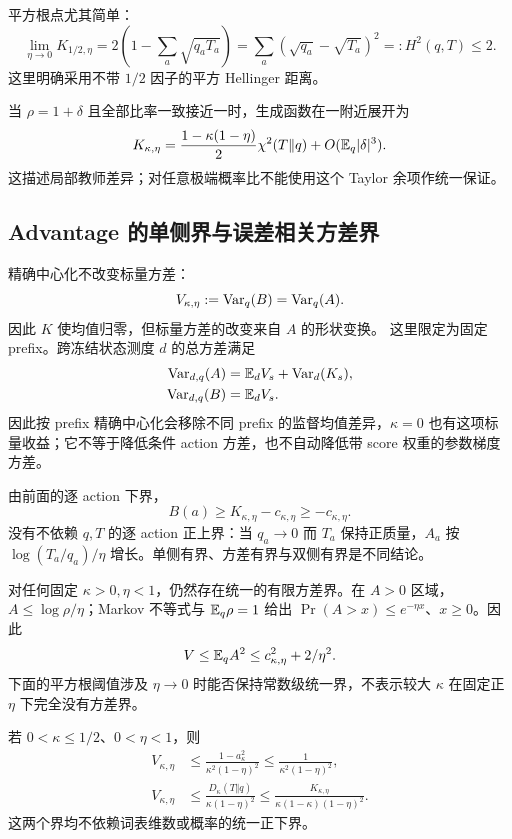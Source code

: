 平方根点尤其简单：
\begin{equation}
 \lim_{\eta\to0}K_{1/2,\eta}
 =2\left(1-\sum_a\sqrt{q_aT_a}\right)
 =\sum_a(\sqrt{q_a}-\sqrt{T_a})^2=:H^2(q,T)\le2.
\end{equation}
这里明确采用不带 $1/2$ 因子的平方 Hellinger 距离。

当 $\rho=1+\delta$ 且全部比率一致接近一时，生成函数在一附近展开为
\begin{equation}
 K_{\kappa,\eta}
 =\frac{1-\kappa(1-\eta)}2\chi^2(T\Vert q)
  +O(\mathbb E_q|\delta|^3).
\end{equation}
这描述局部教师差异；对任意极端概率比不能使用这个 Taylor 余项作统一保证。
\subsection{Advantage 的单侧界与误差相关方差界}

精确中心化不改变标量方差：
\begin{equation}
 V_{\kappa,\eta}:=\operatorname{Var}_q(B)=\operatorname{Var}_q(A).
\end{equation}
因此 $K$ 使均值归零，但标量方差的改变来自 $A$ 的形状变换。 这里限定为固定 prefix。跨冻结状态测度 $d$ 的总方差满足
\begin{align}
 \operatorname{Var}_{d,q}(A)&=\mathbb E_dV_s+\operatorname{Var}_d(K_s),\\
 \operatorname{Var}_{d,q}(B)&=\mathbb E_dV_s.
\end{align}
因此按 prefix 精确中心化会移除不同 prefix 的监督均值差异，$\kappa=0$ 也有这项标量收益；它不等于降低条件 action 方差，也不自动降低带 score 权重的参数梯度方差。

由前面的逐 action 下界，
\begin{equation}
 B(a)\ge K_{\kappa,\eta}-c_{\kappa,\eta}\ge-c_{\kappa,\eta}.
\end{equation}
没有不依赖 $q,T$ 的逐 action 正上界：当 $q_a\to0$ 而 $T_a$ 保持正质量，$A_a$ 按 $\log(T_a/q_a)/\eta$ 增长。单侧有界、方差有界与双侧有界是不同结论。

对任何固定 $\kappa>0,\eta<1$，仍然存在统一的有限方差界。在 $A>0$ 区域，$A\le\log\rho/\eta$；Markov 不等式与 $\mathbb E_q\rho=1$ 给出 $\Pr(A>x)\le e^{-\eta x}$、$x\ge0$。因此
\begin{equation}
 V\le\mathbb E_qA^2\le c_{\kappa,\eta}^2+2/\eta^2.
\end{equation}
下面的平方根阈值涉及 $\eta\to0$ 时能否保持常数级统一界，不表示较大 $\kappa$ 在固定正 $\eta$ 下完全没有方差界。

\begin{theorem}
\label{thm:center-advantage-variance}
若 $0<\kappa\le1/2$、$0<\eta<1$，则
\begin{align}
 V_{\kappa,\eta}
 &\le\frac{1-a_\kappa^2}{\kappa^2(1-\eta)^2}
 \le\frac1{\kappa^2(1-\eta)^2},\\
 V_{\kappa,\eta}
 &\le\frac{D_\kappa(T\Vert q)}{\kappa(1-\eta)^2}
 \le\frac{K_{\kappa,\eta}}{\kappa(1-\kappa)(1-\eta)^2}.
 \label{eq:center-error-scaled-variance}
\end{align}
这两个界均不依赖词表维数或概率的统一正下界。
\end{theorem}

